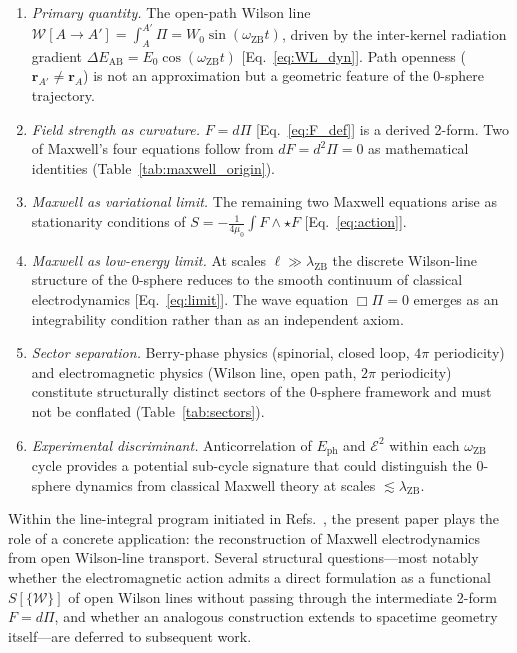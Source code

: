 \documentclass[%
 reprint, amsmath,amssymb, aps, prb, ]{revtex4-2}
\numberwithin{equation}{section}
\newcommand{\omZB}{\omega_{\text{ZB}}}
\newcommand{\EphS}{E_{\text{ph}}}
\newcommand{\Egrad}{\Delta E_{\text{AB}}}
\newcommand{\WL}{\mathcal{W}}
\newcommand{\hodge}{\star}
\begin{document}
\begin{enumerate}
\item \textit{Primary quantity.} The open-path Wilson line $\WL[A\to A'] = \int_A^{A'}\Pi = W_0\sin(\omZB t)$, driven by the inter-kernel radiation gradient $\Egrad = E_0\cos(\omZB t)$ [Eq.~\eqref{eq:WL_dyn}]. Path openness ($\mathbf{r}_{A'}\neq\mathbf{r}_A$) is not an approximation but a geometric feature of the 0-sphere trajectory.

\item \textit{Field strength as curvature.} $F = d\Pi$ [Eq.~\eqref{eq:F_def}] is a derived 2-form. Two of Maxwell's four equations follow from $dF = d^2\Pi = 0$ as mathematical identities (Table~\ref{tab:maxwell_origin}).

\item \textit{Maxwell as variational limit.} The remaining two Maxwell equations arise as stationarity conditions of $S = -\tfrac{1}{4\mu_0}\int F\wedge{\hodge}F$ [Eq.~\eqref{eq:action}].

\item \textit{Maxwell as low-energy limit.} At scales $\ell\gg\lambda_{\text{ZB}}$ the discrete Wilson-line structure of the 0-sphere reduces to the smooth continuum of classical electrodynamics [Eq.~\eqref{eq:limit}]. The wave equation $\Box\Pi=0$ emerges as an integrability condition rather than as an independent axiom.

\item \textit{Sector separation.} Berry-phase physics (spinorial, closed loop, $4\pi$ periodicity) and electromagnetic physics (Wilson line, open path, $2\pi$ periodicity) constitute structurally distinct sectors of the 0-sphere framework and must not be conflated (Table~\ref{tab:sectors}).

\item \textit{Experimental discriminant.} Anticorrelation of $\EphS$ and $\mathcal{E}^2$ within each $\omZB$ cycle provides a potential sub-cycle signature that could distinguish the 0-sphere dynamics from classical Maxwell theory at scales $\lesssim\lambda_{\text{ZB}}$.
\end{enumerate}

Within the line-integral program initiated in Refs.~\cite{hanamura01,hanamura29,hanamura30,hanamura31}, the present paper plays the role of a concrete application: the reconstruction of Maxwell electrodynamics from open Wilson-line transport. Several structural questions---most notably whether the electromagnetic action admits a direct formulation as a functional $S[\{\WL\}]$ of open Wilson lines without passing through the intermediate 2-form $F=d\Pi$, and whether an analogous construction extends to spacetime geometry itself---are deferred to subsequent work.
\end{document}
